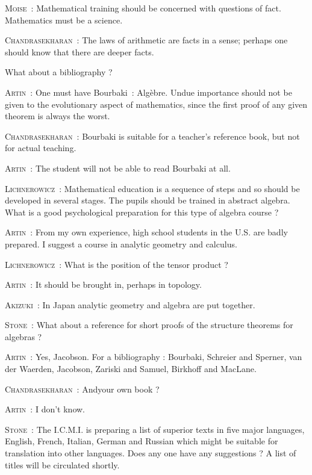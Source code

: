 \smallskip
\noindent
\textsc{Moise}~: Mathematical training should be concerned with questions of fact. Mathematics must be a science.

\smallskip
\noindent
\textsc{Chandrasekharan}~: The laws of arithmetic are facts in a sense; perhaps one should know that there are deeper facts.

\smallskip
What about a bibliography ?
\smallskip

\smallskip
\noindent
\textsc{Artin}~: One must have Bourbaki~: Alg\`ebre. Undue importance should not be given to the evolutionary aspect of mathematics, since the first proof of any given theorem is always the worst.

\smallskip
\noindent
\textsc{Chandrasekharan}~: Bourbaki is suitable for a teacher's reference book, but not for actual teaching.

\smallskip
\noindent
\textsc{Artin}~: The student will not be able to read Bourbaki at all.

\smallskip
\noindent
\textsc{Lichnerowicz}~: Mathematical education is a sequence of steps and so should be developed in several stages. The pupils should be trained in abstract algebra. What is a good psychological preparation for this type of algebra course ?

\smallskip
\noindent
\textsc{Artin}~: From my own experience, high school students in the U.S. are badly prepared. I suggest a course in analytic geometry and calculus.

\smallskip
\noindent
\textsc{Lichnerowicz}~: What is the position of the tensor product ?

\smallskip
\noindent
\textsc{Artin}~: It should be brought in, perhaps in topology.

\smallskip
\noindent
\textsc{Akizuki}~: In Japan analytic geometry and algebra are put together.

\smallskip
\noindent
\textsc{Stone}~: What about a reference for short proofs of the structure theorems for algebras ?

\smallskip
\noindent
\textsc{Artin}~: Yes, Jacobson. For a bibliography : Bourbaki, Schreier and Sperner, van der Waerden, Jacobson, Zariski and Samuel, Birkhoff and MacLane.

\smallskip
\noindent
\textsc{Chandrasekharan}~: And\pageoriginale your own book ?

\smallskip
\noindent
\textsc{Artin}~: I don't know.

\smallskip
\noindent
\textsc{Stone}~: The I.C.M.I. is preparing a list of superior texts in five major languages, English, French, Italian, German and Russian which might be suitable for translation into other languages. Does any one have any suggestions ? A list of titles will be circulated shortly.

